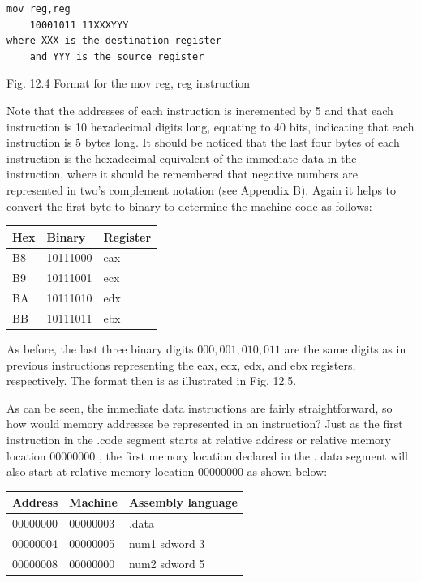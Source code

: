 \documentclass[10pt]{article}
\begin{document}
\begin{verbatim}
mov reg,reg
    10001011 11XXXYYY
where XXX is the destination register
    and YYY is the source register
\end{verbatim}

Fig. 12.4 Format for the mov reg, reg instruction

Note that the addresses of each instruction is incremented by 5 and that each instruction is 10 hexadecimal digits long, equating to 40 bits, indicating that each instruction is 5 bytes long. It should be noticed that the last four bytes of each instruction is the hexadecimal equivalent of the immediate data in the instruction, where it should be remembered that negative numbers are represented in two's complement notation (see Appendix B). Again it helps to convert the first byte to binary to determine the machine code as follows:

\begin{center}
\begin{tabular}{|l|l|l|}
\hline
Hex & Binary & Register \\
\hline
B8 & 10111000 & eax \\
\hline
B9 & 10111001 & ecx \\
\hline
BA & 10111010 & edx \\
\hline
BB & 10111011 & ebx \\
\hline
\end{tabular}
\end{center}

As before, the last three binary digits $000,001,010,011$ are the same digits as in previous instructions representing the eax, ecx, edx, and ebx registers, respectively. The format then is as illustrated in Fig. 12.5.

As can be seen, the immediate data instructions are fairly straightforward, so how would memory addresses be represented in an instruction? Just as the first instruction in the .code segment starts at relative address or relative memory location 00000000 , the first memory location declared in the . data segment will also start at relative memory location 00000000 as shown below:

\begin{center}
\begin{tabular}{|l|l|l|}
\hline
Address & Machine & Assembly language \\
\hline\hline
00000000 & 00000003 & .data \\
\hline
00000004 & 00000005 & num1 sdword 3 \\
\hline
00000008 & 00000000 & num2 sdword 5 \\
\hline
\end{tabular}
\end{center}
\end{document}
